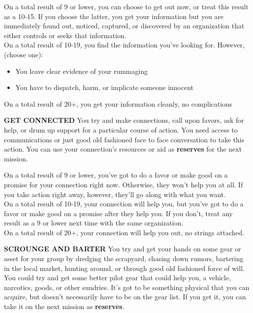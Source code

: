 On a total result of 9 or lower, you can choose to get out now, or treat this result as a 10-15. If you choose the latter, you get your information but you are immediately found out, noticed, captured, or discovered by an organization that either controls or seeks that information.\\
On a total result of 10-19, you find the information you’ve looking for. However, (choose one):
\begin{itemize}
\item You leave clear evidence of your rummaging
\item You have to dispatch, harm, or implicate someone innocent
\end{itemize}  
On a total result of 20+, you get your information cleanly, no complications

\textbf{GET CONNECTED}
You try and make connections, call upon favors, ask for help, or drum up support for a particular course of action. You need access to communications or just good old fashioned face to face conversation to take this action. You can use your connection’s resources or aid as \textbf{reserves} for the next mission.

On a total result of 9 or lower, you’ve got to do a favor or make good on a promise for your connection right now. Otherwise, they won’t help you at all. If you take action right away, however, they’ll go along with what you want.\\
On a total result of 10-19, your connection will help you, but you’ve got to do a favor or make good on a promise after they help you. If you don’t, treat any result as a 9 or lower next time with the same organization.\\
On a total result of 20+, your connection will help you out, no strings attached.

\textbf{SCROUNGE AND BARTER}
You try and get your hands on some gear or asset for your group by dredging the scrapyard, chasing down rumors, bartering in the local market, hunting around, or through good old fashioned force of will. You could try and get some better pilot gear that could help you, a vehicle, narcotics, goods, or other sundries. It’s got to be something physical that you can acquire, but doesn’t necessarily have to be on the gear list. If you get it, you can take it on the next mission as \textbf{reserves}.

